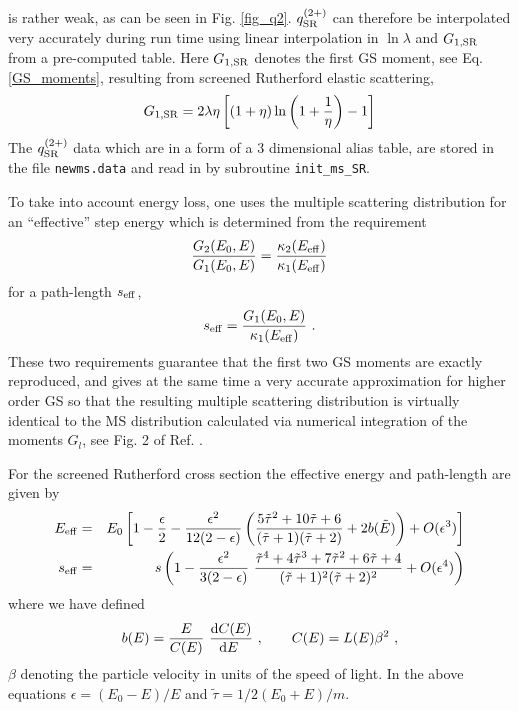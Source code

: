 is rather weak, as can be seen in Fig. \ref{fig_q2}. 
$q^{(2+)}_{\rm SR}$ can therefore be interpolated 
very accurately during run time using 
linear interpolation in $\ln \lambda$ and $G_{1,{\rm SR}}$ 
from a pre-computed table.
Here $G_{1,{\rm SR}}$ denotes the first 
GS moment, see Eq. \eqref{GS_moments}, resulting 
from screened Rutherford elastic scattering,
\begin{equation}
\label{G1_SR}
G_{1,{\rm SR}} = 
2 \lambda \eta \left[ (1 + \eta) \ln\left(1 + \frac{1}{\eta}\right) - 1
\right]
\end{equation}
The $q^{(2+)}_{\rm SR}$ data which are in a form of a 3 dimensional 
alias table, are stored in the file {\tt newms.data} and read in  
by subroutine {\tt init\_ms\_SR}.

To take into account energy loss, one uses the multiple scattering 
distribution for an ``effective'' step energy which is 
determined from the requirement \cite{Ka99a}
\begin{equation}
{G_2(E_0,E) \over G_1(E_0,E)} = 
{\kappa_2(E_{\rm eff}) \over \kappa_1(E_{\rm eff})}
\end{equation}
for a path-length $s_{\rm eff}$,
\begin{equation}
s_{\rm eff} = {G_1(E_0,E) \over \kappa_1(E_{\rm eff})}~.
\end{equation}
These two requirements guarantee that the first two GS moments 
are exactly reproduced, and gives at the same time a very accurate 
approximation for higher order GS so that the resulting 
multiple scattering distribution is virtually 
identical to the MS distribution calculated via numerical integration 
of the moments $G_l$, see Fig. 2 of Ref. \cite{Ka99a}.

For the screened Rutherford cross section the effective energy and 
path-length are given by 
\begin{eqnarray}
\label{E-eff}
E_{\rm eff} & = & E_0 \left[ 1 - {\epsilon \over 2} - 
{\epsilon^2 \over 12 (2 - \epsilon)} \left( 
{5 \tilde{\tau}^2 + 10 \tilde{\tau} + 6 \over (\tilde{\tau} + 1) 
(\tilde{\tau} + 2)} + 2 b(\tilde{E}) \right) + O(\epsilon^3) \right] 
\nonumber \\
s_{\rm eff} & = & s \left( 1 - {\epsilon^2 \over 3 ( 2 - \epsilon)}~ 
{\tilde{\tau}^4 + 4 \tilde{\tau}^3 + 7 \tilde{\tau}^2 + 6 \tilde{\tau} 
+ 4 \over (\tilde{\tau} + 1)^2 (\tilde{\tau} + 2)^2} + O(\epsilon^4) \right)
\end{eqnarray}
where we have defined
\begin{equation}
\label{bE}
b(E) = {E \over C(E)}~ 
{{\rm d} C(E) \over {\rm d}E~}~,\quad \quad C(E) = L(E) \beta^2~,
\end{equation}
$\beta$ denoting the particle velocity in units of the speed of light.
In the above equations $\epsilon = (E_0 - E)/E$ and $\tilde{\tau} = 
1/2 (E_0 + E)/m$.

